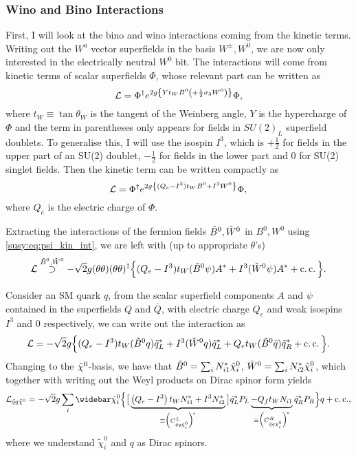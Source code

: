 \documentclass[../main.tex]{subfiles}
\begin{document}
\subsubsection*{Wino and Bino Interactions}
First, I will look at the bino and wino interactions coming from the kinetic terms.
Writing out the \(W^a\) vector superfields in the basis \(W^\pm, W^0\), we are now only interested in the electrically neutral \(W^0\) bit.
The interactions will come from kinetic terms of scalar superfields \(\Phi\), whose relevant part can be written as
\begin{equation}
  \L = \Phi^\dagger \exp{2g\cclosed{Y t_W B^0 \pclosed{+ \frac{1}{2}\sigma_3 W^0}}} \Phi,
\end{equation}
where \(t_W \equiv \tan\theta_W\) is the tangent of the Weinberg angle, \(Y\) is the hypercharge of \(\Phi\) and the term in parentheses only appears for fields in \(SU(2)_L\) superfield doublets.
To generalise this, I will use the isospin \(I^3\), which is \(+\frac{1}{2}\) for fields in the upper part of an SU(2) doublet, \(-\frac{1}{2}\) for fields in the lower part and 0 for SU(2) singlet fields.
Then the kinetic term can be written compactly as
\begin{equation}
  \L = \Phi^\dagger \exp{2g\cclosed{(Q_e - I^3) t_W B^0 + I^3 W^0}} \Phi,
\end{equation}
where \(Q_e\) is the electric charge of \(\Phi\).
\medskip

Extracting the interactions of the fermion fields \(\bino, \wino\) in \(B^0,
W^0\) using \cref{susy:eq:psi_kin_int}, we are left with (up to appropriate
\(\theta\)'s)
\begin{equation}
  \L \stackrel{\bino, \wino}{\supset} -\sqrt{2}g (\theta\theta)(\theta\theta)^\dagger \Big\{ (Q_e - I^3)t_W (\bino \psi) A^\ast + I^3 (\wino \psi) A^\ast + \cc \Big\}.
\end{equation}

Consider an SM quark \(q\), from the scalar superfield components \(A\) and \(\psi\) contained in the superfields \(Q\) and \(\bar{Q}\), with
electric charge \(Q_e\) and weak isospins \(I^3\) and 0 respectively, we can write out the interaction as
\begin{equation}
  \L = -\sqrt{2}g \Big\{ (Q_e - I^3)t_W (\bino q) \tilde{q}_{L}^\ast + I^3 (\wino q) \tilde{q}_{L}^\ast + Q_e t_W (\bino \bar{q}) \tilde{q}_{R}^\ast + \cc \Big\}.
\end{equation}
Changing to the \(\nino\)-basis, we have that \(\bino = \sum_i N_{i1}^\ast \nino[i]\), \(\wino = \sum_i N_{i2}^\ast \nino[i]\), which together with writing out the Weyl products on Dirac spinor form yields
\begin{equation}
  \label{susy:eq:nino_sf_f_int}
  \L_{\tilde{q}q\tilde{\chi}^0} = -\sqrt{2} g \sum_{i} \barnino[i] \Big\{ \big[ \underbrace{\pclosed{Q_e - I^3}t_W N_{i1}^\ast  + I^3 N_{i2}^\ast}_{\equiv \Big(C_{\tilde{q} q \tilde{\chi}_i^0}^{L}\Big)^{\!\ast}} \big] \tilde{q}_{L}^\ast P_L \underbrace{- Q_f t_W N_{i1}}_{\equiv \Big(C_{\tilde{q} q \tilde{\chi}_i^0}^{R}\Big)^{\!\ast}} \tilde{q}_{R}^\ast P_R \Big\} q + \cc,
\end{equation}
where we understand \(\tilde\chi^0_i\) and \(q\) as Dirac spinors.
\end{document}
